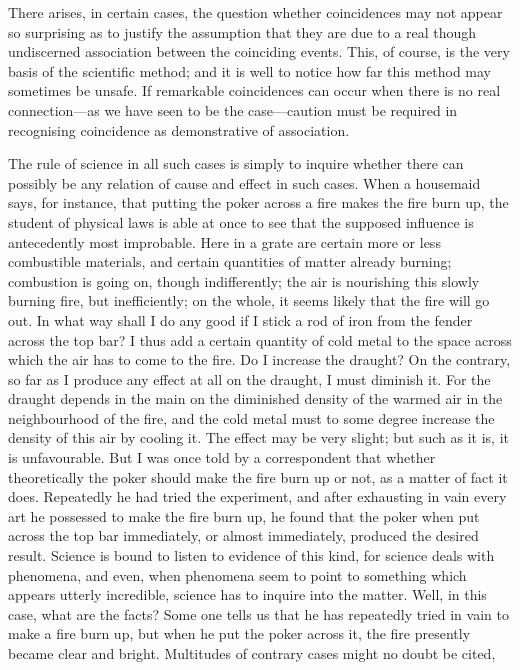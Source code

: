 \documentclass[letterpaper,12pt,oneside,openany]{memoir}
\begin{document}
There arises, in certain cases, the question whether
coincidences may not appear so surprising as to justify
the assumption that they are due to a real though
undiscerned association between the coinciding events.
This, of course, is the very basis of the scientific
method; and it is well to notice how far this method
may sometimes be unsafe. If remarkable coincidences
can occur when there is no real connection---as we have
seen to be the case---caution must be required in
recognising coincidence as demonstrative of association.

The rule of science in all such cases is simply to
inquire whether there can possibly be any relation of
cause and effect in such cases. When a housemaid
says, for instance, that putting the poker across a fire
makes the fire burn up, the student of physical laws is
able at once to see that the supposed influence is antecedently
most improbable. Here in a grate are certain
more or less combustible materials, and certain quantities
of matter already burning; combustion is going
on, though indifferently; the air is nourishing this
slowly burning fire, but inefficiently; on the whole, it
seems likely that the fire will go out. In what way
shall I do any good if I stick a rod of iron from the
fender across the top bar? I thus add a certain quantity
of cold metal to the space across which the air has to
come to the fire. Do I increase the draught? On the
contrary, so far as I produce any effect at all on the
draught, I must diminish it. For the draught depends
in the main on the diminished density of the warmed
air in the neighbourhood of the fire, and the cold metal
must to some degree increase the density of this air by
cooling it. The effect may be very slight; but such as
it is, it is unfavourable. But I was once told by a correspondent
that whether theoretically the poker should
make the fire burn up or not, as a matter of fact it does.
Repeatedly he had tried the experiment, and after exhausting
in vain every art he possessed to make the
fire burn up, he found that the poker when put across
the top bar immediately, or almost immediately, produced
the desired result. Science is bound to listen to
evidence of this kind, for science deals with phenomena,
and even, when phenomena seem to point to something
which appears utterly incredible, science has to inquire
into the matter. Well, in this case, what are the facts?
Some one tells us that he has repeatedly tried in vain
to make a fire burn up, but when he put the poker
across it, the fire presently became clear and bright.
Multitudes of contrary cases might no doubt be cited,
\end{document}
